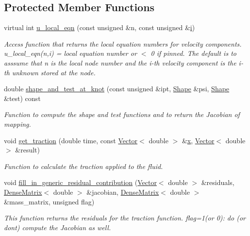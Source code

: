 \subsection*{Protected Member Functions}
\begin{DoxyCompactItemize}
\item 
virtual int \hyperlink{classoomph_1_1PolarNavierStokesTractionElement_ae49f57135d1fdd4ed3e4117b4e9c5801}{u\+\_\+local\+\_\+eqn} (const unsigned \&n, const unsigned \&\hyperlink{cfortran_8h_adb50e893b86b3e55e751a42eab3cba82}{i})
\begin{DoxyCompactList}\small\item\em Access function that returns the local equation numbers for velocity components. u\+\_\+local\+\_\+eqn(n,i) = local equation number or $<$ 0 if pinned. The default is to asssume that n is the local node number and the i-\/th velocity component is the i-\/th unknown stored at the node. \end{DoxyCompactList}\item 
double \hyperlink{classoomph_1_1PolarNavierStokesTractionElement_aa4c33668b9cf2a9c38cc10c72466f32d}{shape\+\_\+and\+\_\+test\+\_\+at\+\_\+knot} (const unsigned \&ipt, \hyperlink{classoomph_1_1Shape}{Shape} \&psi, \hyperlink{classoomph_1_1Shape}{Shape} \&test) const
\begin{DoxyCompactList}\small\item\em Function to compute the shape and test functions and to return the Jacobian of mapping. \end{DoxyCompactList}\item 
void \hyperlink{classoomph_1_1PolarNavierStokesTractionElement_a19fbac9a9a627b4565440c8ca38ce1da}{get\+\_\+traction} (double time, const \hyperlink{classoomph_1_1Vector}{Vector}$<$ double $>$ \&\hyperlink{classoomph_1_1PolarNavierStokesTractionElement_a9c89a9bed61686e2fb60717f133f8f02}{x}, \hyperlink{classoomph_1_1Vector}{Vector}$<$ double $>$ \&result)
\begin{DoxyCompactList}\small\item\em Function to calculate the traction applied to the fluid. \end{DoxyCompactList}\item 
void \hyperlink{classoomph_1_1PolarNavierStokesTractionElement_a5708f04fc0d30cc4a8000680adc8f2cf}{fill\+\_\+in\+\_\+generic\+\_\+residual\+\_\+contribution} (\hyperlink{classoomph_1_1Vector}{Vector}$<$ double $>$ \&residuals, \hyperlink{classoomph_1_1DenseMatrix}{Dense\+Matrix}$<$ double $>$ \&jacobian, \hyperlink{classoomph_1_1DenseMatrix}{Dense\+Matrix}$<$ double $>$ \&mass\+\_\+matrix, unsigned flag)
\begin{DoxyCompactList}\small\item\em This function returns the residuals for the traction function. flag=1(or 0)\+: do (or don\textquotesingle{}t) compute the Jacobian as well. \end{DoxyCompactList}\end{DoxyCompactItemize}
